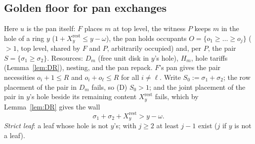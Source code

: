 \documentclass[11pt]{article}
\theoremstyle{definition}
\begin{document}
\subsection{Golden floor for pan exchanges}\label{app:pan-app}

Here $u$ is the pan itself: $F$ places $m$ at top level, the witness $P$
keeps $m$ in the hole of a ring $y$ ($1+X_y^{\mathrm{rest}}\le
y-\omega$), the pan holds occupants $O=\{o_1\ge\dots\ge o_j\}$ ($>1$,
top level, shared by $F$ and $P$, arbitrarily occupied) and, per $P$, the
pair $S=\{\sigma_1\ge\sigma_2\}$. Resources: $D_m$ (free unit disk in
$y$'s hole), $H_m$, hole tariffs (Lemma~\ref{lem:DR}), nesting, and the
pan repack. $F$'s pan gives the pair necessities $o_i+1\le R$ and
$o_i+o_\ell\le R$ for all $i\ne\ell$. Write $S_0:=\sigma_1+\sigma_2$;
the row placement of the pair in $D_m$ fails, so (D) $S_0>1$; and the
joint placement of the pair in $y$'s hole beside its remaining content
$X_y^{\mathrm{rest}}$ fails, which by Lemma~\ref{lem:DR} gives the wall
\begin{equation}
\sigma_1+\sigma_2+X_y^{\mathrm{rest}}>y-\omega.\tag{Ry}
\end{equation}
\emph{Strict leaf}: a leaf whose hole is not $y$'s; with $j\ge2$ at
least $j-1$ exist ($j$ if $y$ is not a leaf).
\end{document}
